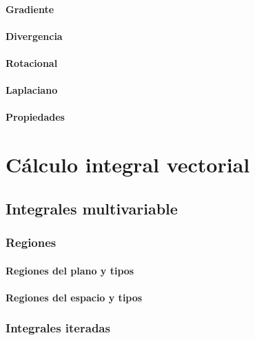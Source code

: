 \documentclass[12pt, fleqn]{report}                             %
\theoremstyle{break}                                            %
\begin{document}
            \subsection{Gradiente}
            
            \subsection{Divergencia}
            
            \subsection{Rotacional}
            
            \subsection{Laplaciano}
            
            \subsection{Propiedades}



\part{Cálculo integral vectorial}

    \chapter{Integrales multivariable}
    
        \section{Regiones}
        
            \subsection{Regiones del plano y tipos}
            
            \subsection{Regiones del espacio y tipos}
        
        \section{Integrales iteradas}
        
\end{document}

